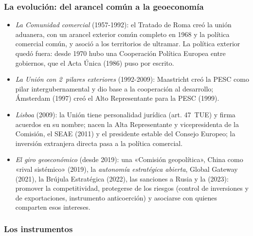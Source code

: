 \documentclass[11pt]{article}
\begin{document}
\begin{infografia}[H]
\centering
\caption{Quién decide la acción exterior de la Unión}\label{figu:actores}
\end{infografia}

\subsubsection{La evolución: del arancel común a la geoeconomía}\label{sec:evolucion}

\begin{itemize}
\item \emph{La Comunidad comercial} (1957-1992): el Tratado de Roma creó la unión aduanera, con un arancel exterior común completo en 1968 y la política comercial común, y asoció a los territorios de ultramar. La política exterior quedó fuera: desde 1970 hubo una Cooperación Política Europea entre gobiernos, que el Acta Única (1986) puso por escrito.
\item \emph{La Unión con 2~pilares exteriores} (1992-2009): Maastricht creó la PESC como pilar intergubernamental y dio base a la cooperación al desarrollo; Ámsterdam (1997) creó el Alto Representante para la PESC (1999).
\item \emph{Lisboa} (2009): la Unión tiene personalidad jurídica (art. 47~TUE) y firma acuerdos en su nombre; nacen la Alta Representante y vicepresidenta de la Comisión, el SEAE (2011) y el presidente estable del Consejo Europeo; la inversión extranjera directa pasa a la política comercial\nocite{UE2016TUE}.
\item \emph{El giro geoeconómico} (desde 2019): una «Comisión geopolítica», China como «rival sistémico» (2019), la \emph{autonomía estratégica abierta}, Global Gateway (2021), la Brújula Estratégica (2022), las sanciones a Rusia y la  (2023): promover la competitividad, protegerse de los riesgos (control de inversiones y de exportaciones, instrumento anticoerción) y asociarse con quienes comparten esos intereses\nocite{CE2019China}.
\end{itemize}

\subsubsection{Los instrumentos}\label{sec:instrumentos}
\end{document}
